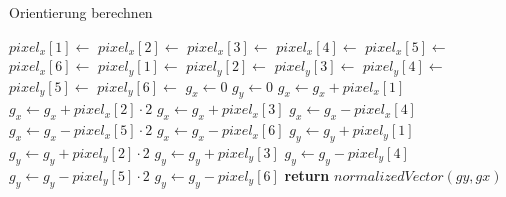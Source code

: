 \begin{algorithm}
	\caption{Orientierung berechnen}
	\label{src:analyseOrientation}
	\begin{algorithmic}[1]
			\State $pixel_x[1] \gets$ 
			\State $pixel_x[2] \gets$ 
			\State $pixel_x[3] \gets$ 
			\State $pixel_x[4] \gets$ 
			\State $pixel_x[5] \gets$ 
			\State $pixel_x[6] \gets$ 
			\Statex
			\State $pixel_y[1] \gets$ 
			\State $pixel_y[2] \gets$ 
			\State $pixel_y[3] \gets$ 
			\State $pixel_y[4] \gets$ 
			\State $pixel_y[5] \gets$ 
			\State $pixel_y[6] \gets$ 
			\Statex
			\State $g_x \gets 0$
			\State $g_y \gets 0$
			\Statex
			\State $g_x \gets g_x + pixel_x[1]$
			\State $g_x \gets g_x + pixel_x[2] \cdot 2$
			\State $g_x \gets g_x + pixel_x[3]$
			\State $g_x \gets g_x - pixel_x[4]$
			\State $g_x \gets g_x - pixel_x[5] \cdot 2$
			\State $g_x \gets g_x - pixel_x[6]$
			\Statex
			\State $g_y \gets g_y + pixel_y[1]$
			\State $g_y \gets g_y + pixel_y[2] \cdot 2$
			\State $g_y \gets g_y + pixel_y[3]$
			\State $g_y \gets g_y - pixel_y[4]$
			\State $g_y \gets g_y - pixel_y[5] \cdot 2$
			\State $g_y \gets g_y - pixel_y[6]$
			\State \textbf{return} $normalizedVector(gy, gx)$
		\EndProcedure
	\end{algorithmic}
\end{algorithm}
